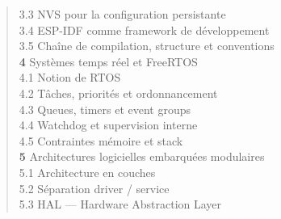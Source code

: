 \begin{quote}
\hspace{2.5em} 3.3 \hspace{0.5em} NVS pour la configuration persistante \dotfill \pageref{subsec:nvs}\\
\hspace{2.5em} 3.4 \hspace{0.5em} ESP-IDF comme framework de développement \dotfill \pageref{subsec:espidf}\\
\hspace{2.5em} 3.5 \hspace{0.5em} Chaîne de compilation, structure et conventions \dotfill \pageref{subsec:toolchain}\\
\textbf{4} \hspace{1em} Systèmes temps réel et FreeRTOS \dotfill \pageref{sec:freertos}\\
\hspace{2.5em} 4.1 \hspace{0.5em} Notion de RTOS \dotfill \pageref{subsec:rtos}\\
\hspace{2.5em} 4.2 \hspace{0.5em} Tâches, priorités et ordonnancement \dotfill \pageref{subsec:tasks}\\
\hspace{2.5em} 4.3 \hspace{0.5em} Queues, timers et event groups \dotfill \pageref{subsec:sync}\\
\hspace{2.5em} 4.4 \hspace{0.5em} Watchdog et supervision interne \dotfill \pageref{subsec:watchdog}\\
\hspace{2.5em} 4.5 \hspace{0.5em} Contraintes mémoire et stack \dotfill \pageref{subsec:mem_stack}\\
\textbf{5} \hspace{1em} Architectures logicielles embarquées modulaires \dotfill \pageref{sec:modularity}\\
\hspace{2.5em} 5.1 \hspace{0.5em} Architecture en couches \dotfill \pageref{subsec:layers}\\
\hspace{2.5em} 5.2 \hspace{0.5em} Séparation driver / service \dotfill \pageref{subsec:driver_service}\\
\hspace{2.5em} 5.3 \hspace{0.5em} HAL — Hardware Abstraction Layer \dotfill \pageref{subsec:hal}\\

\end{quote}
